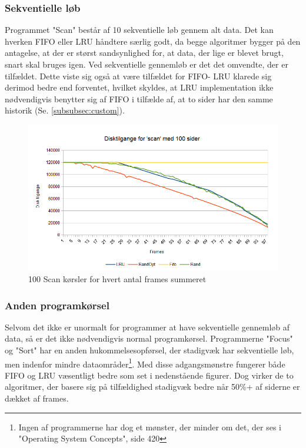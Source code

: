 \subsubsection{Sekventielle løb}
Programmet "Scan" består af 10 sekventielle løb gennem alt data. Det kan hverken FIFO eller LRU håndtere særlig godt, da begge algoritmer bygger på den antagelse, at der er størst sandsynlighed for, at data, der lige er blevet brugt, snart skal bruges igen. Ved sekventielle gennemløb er det det omvendte, der er tilfældet. Dette viste sig også at være tilfældet for FIFO- LRU klarede sig derimod bedre end forventet, hvilket skyldes, at LRU implementation ikke nødvendigvis benytter sig af FIFO i tilfælde af, at to sider har den samme historik (Se. \ref{subsubsec:custom}).

\begin{figure}[ht]
\centerline{\includegraphics[scale=0.8]{graph/stat_scan}}
\caption{100 Scan kørsler for hvert antal frames summeret}
\label{fig:scan}
\end{figure}

\subsubsection{Anden programkørsel}
Selvom det ikke er unormalt for programmer at have sekventielle gennemløb af data, så er det ikke nødvendigvis normal programkørsel. Programmerne "Focus" og "Sort" har en anden hukommelsesopførsel, der stadigvæk har sekventielle løb, men indenfor mindre dataområder\footnote{Ingen af programmerne har dog et mønster, der minder om det, der ses i "Operating System Concepts", side 420}. Med disse adgangsmønstre fungerer både FIFO og LRU væsentligt bedre som set i nedenstående figurer. Dog virker de to algoritmer, der basere sig på tilfældighed stadigvæk bedre når 50\%+ af siderne er dækket af frames. 


